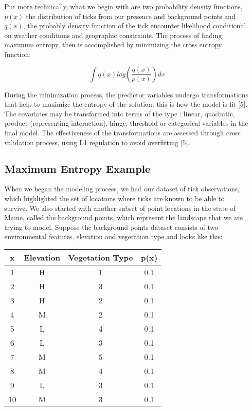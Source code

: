 \noindent Put more technically, what we begin with are two probability density functions, $p(x)$ the distribution of ticks from our presence and background points and $q(x)$, the probably density function of the tick encounter likelihood conditional on weather conditions and geographic constraints. The process of finding maximum entropy, then is  accomplished by minimizing the cross entropy function:  \newline

\begin{equation}
\int q(x)log(\frac{q(x)}{p(x)}) dx
\end{equation}


\noindent  During the minimization process, the predictor variables undergo transformations that help to maximize the entropy of the solution; this is how the model is fit [5]. The covariates may be transformed into terms of the type : linear, quadratic, product (representing interaction), hinge, threshold or categorical variables in the final model. The effectiveness of the transformations are assessed through cross validation process, using L1 regulation to avoid overfitting [5].  \newline


\subsection{Maximum Entropy Example}

\noindent When we began the modeling process, we had our dataset of tick observations, which highlighted the set of locations where ticks are known to be able to survive. We also started with another subset of point locations in the state of Maine, called the background points, which represent the landscape that we are trying to model. Suppose the background points dataset consists of two environmental features, elevation and vegetation type and looks like this: 

\begin{center}
 \begin{tabular}{||c c c c||} 
 \hline
 x & Elevation & Vegetation Type & p(x) \\ [0.5ex] 
 \hline\hline
 1 & H &  1& 0.1  \\ 
 \hline
  2 & H & 3 & 0.1\\
 \hline
   3 & H & 2 & 0.1\\
 \hline
 4 & M & 2 & 0.1  \\
 \hline
  5 & L & 4 & 0.1 \\
 \hline
   6 & L & 3 & 0.1\\
 \hline
  7 & M & 5 & 0.1 \\
 \hline
   8 & M & 4 & 0.1\\
 \hline
 9 & L & 3 & 0.1 \\
 \hline
   10 & M & 3 & 0.1\\
 \hline
\end{tabular}
\end{center}


